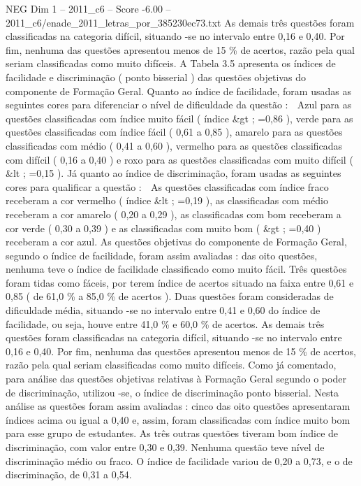 \begin{textsample}{NEG Dim 1 – 2011\_c6 – Score -6.00 – 2011\_c6/enade\_2011\_letras\_por\_385230ec73.txt}
As demais três questões foram classificadas na categoria difícil, situando -se no intervalo entre 0,16 e 0,40.
Por fim, nenhuma das questões apresentou menos de 15 \% de acertos, razão pela qual seriam classificadas como muito difíceis.
A Tabela 3.5 apresenta os índices de facilidade e discriminação ( ponto bisserial ) das questões objetivas do componente de Formação Geral.
Quanto ao índice de facilidade, foram usadas as seguintes cores para diferenciar o nível de dificuldade da questão :  Azul para as questões classificadas com índice muito fácil ( índice \&gt ; =0,86 ), verde para as questões classificadas com índice fácil ( 0,61 a 0,85 ), amarelo para as questões classificadas com médio ( 0,41 a 0,60 ), vermelho para as questões classificadas com difícil ( 0,16 a 0,40 ) e roxo para as questões classificadas com muito difícil ( \&lt ; =0,15 ).
Já quanto ao índice de discriminação, foram usadas as seguintes cores para qualificar a questão :  As questões classificadas com índice fraco receberam a cor vermelho ( índice \&lt ; =0,19 ), as classificadas com médio receberam a cor amarelo ( 0,20 a 0,29 ), as classificadas com bom receberam a cor verde ( 0,30 a 0,39 ) e as classificadas com muito bom ( \&gt ; =0,40 ) receberam a cor azul.
As questões objetivas do componente de Formação Geral, segundo o índice de facilidade, foram assim avaliadas : das oito questões, nenhuma teve o índice de facilidade classificado como muito fácil.
Três questões foram tidas como fáceis, por terem índice de acertos situado na faixa entre 0,61 e 0,85 ( de 61,0 \% a 85,0 \% de acertos ).
Duas questões foram consideradas de dificuldade média, situando -se no intervalo entre 0,41 e 0,60 do índice de facilidade, ou seja, houve entre 41,0 \% e 60,0 \% de acertos.
As demais três questões foram classificadas na categoria difícil, situando -se no intervalo entre 0,16 e 0,40.
Por fim, nenhuma das questões apresentou menos de 15 \% de acertos, razão pela qual seriam classificadas como muito difíceis.
Como já comentado, para análise das questões objetivas relativas à Formação Geral segundo o poder de discriminação, utilizou -se, o índice de discriminação ponto bisserial.
Nesta análise as questões foram assim avaliadas : cinco das oito questões apresentaram índices acima ou igual a 0,40 e, assim, foram classificadas com índice muito bom para esse grupo de estudantes.
As três outras questões tiveram bom índice de discriminação, com valor entre 0,30 e 0,39.
Nenhuma questão teve nível de discriminação médio ou fraco.
O índice de facilidade variou de 0,20 a 0,73, e o de discriminação, de 0,31 a 0,54.

\end{textsample}
